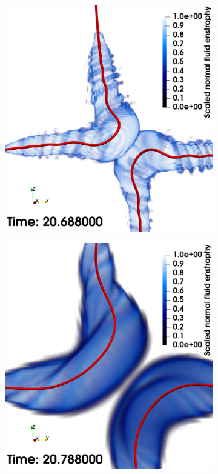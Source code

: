 \documentclass[%
 reprint,
 amsmath,amssymb,
 aps,
 prl,
]{revtex4-2}
\begin{document}
\begin{figure}
\begin{subfigure}[b]{0.24\textwidth}
	\end{subfigure}
    \begin{subfigure}[b]{0.24\textwidth}
		\centering
		\includegraphics*[width=\textwidth]{snap-3.pdf}
	\end{subfigure}
    \begin{subfigure}[b]{0.24\textwidth}
		\centering
		\includegraphics*[width=\textwidth]{snap-4.pdf}

\end{subfigure}
\end{figure}
\end{document}
